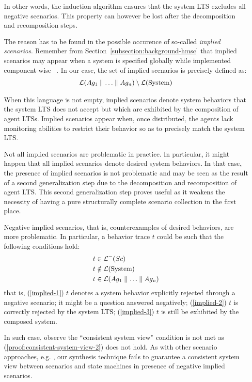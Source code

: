 In other words, the induction algorithm ensures that the system LTS excludes all negative scenarios. This property can however be lost after the decomposition and recomposition steps.

The reason has to be found in the possible occurence of so-called \emph{implied scenarios}. Remember from Section~\ref{subsection:background-hmsc} that implied scenarios may appear when a system is specified globally while implemented component-wise ~\cite{Alur:2000, Uchitel:2004}. In our case, the set of implied scenarios is precisely defined as:
\begin{align*}
\mathcal{L}(Ag_1 \parallel \ldots \parallel Ag_n) \setminus \mathcal{L}(\mbox{System})
\end{align*}

When this language is not empty, implied scenarios denote system behaviors that the system LTS does not accept but which are exhibited by the composition of agent LTSs. Implied scenarios appear when, once distributed, the agents lack monitoring abilities to restrict their behavior so as to precisely match the system LTS.

Not all implied scenarios are problematic in practice. In particular, it might happen that all implied scenarios denote desired system behaviors. In that case, the presence of implied scenarios is not problematic and may be seen as the result of a second generalization step due to the decomposition and recomposition of agent LTS. This second generalization step proves useful as it weakens the necessity of having a pure structurally complete scenario collection in the first place.

Negative implied scenarios, that is, counterexamples of desired behaviors, are more problematic. In particular, a behavior trace $t$ could be such that the following conditions hold:
\begin{align}
&t \in \mathcal{L}^-(Sc)\label{implied-1}\\
&t \notin \mathcal{L}(\mbox{System})\label{implied-2}\\
&t \in \mathcal{L}(Ag_1 \parallel \ldots \parallel Ag_n)\label{implied-3}
\end{align}
that is, (\ref{implied-1}) $t$ denotes a system behavior explicitly rejected through a negative scenario; it might be a question answered negatively; (\ref{implied-2}) $t$ is correctly rejected by the system LTS; (\ref{implied-3}) $t$ is still be exhibited by the composed system.

In such case, observe the ``consistent system view'' condition is not met as (\ref{proof:consistent-system-view-2}) does not hold. As with other scenario approaches, e.g. \cite{Alur:2000, Uchitel:2004}, our synthesis technique fails to guarantee a consistent system view between scenarios and state machines in presence of negative implied scenarios.

